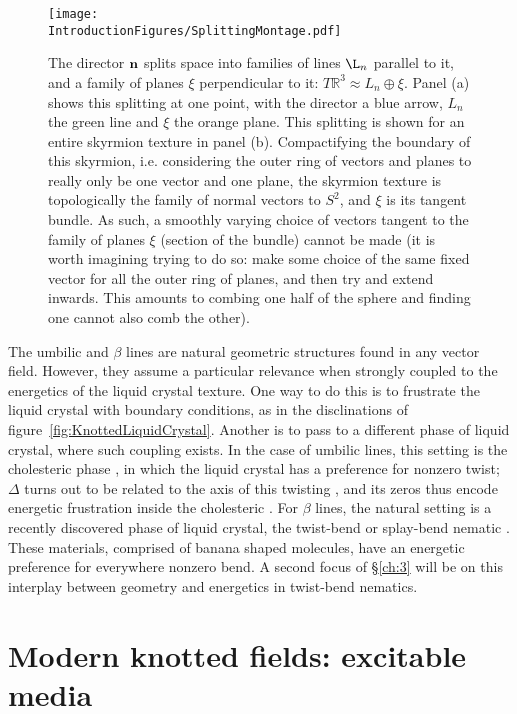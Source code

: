 \begin{figure}[htbp]
\centering
\texttt{[image: \\IntroductionFigures/SplittingMontage.pdf]}
\caption{ The director $\bf n $ splits space into families of lines $\L_n$ parallel to it, and a family of planes $\xi$ perpendicular to it: $T \mathbb{R}^3 \approx L_n \oplus \xi$. Panel (a) shows this splitting at one point, with the director a blue arrow, $L_n$ the green line and $\xi$ the orange plane. This splitting is shown for an entire skyrmion texture in panel (b). Compactifying the boundary of this skyrmion, i.e. considering the outer ring of vectors and planes to really only be one vector and one plane, the skyrmion texture is topologically the family of normal vectors to $S^2$, and $\xi$ is its tangent bundle. As such, a smoothly varying choice of vectors tangent to the family of planes $\xi$ (section of the bundle) cannot be made (it is worth imagining trying to do so: make some choice of the same fixed vector for all the outer ring of planes, and then try and extend inwards. This amounts to combing one half of the sphere and finding one cannot also comb the other).}
\label{fig:SplittingMontage}
\end{figure}

The umbilic and $\beta$ lines are natural geometric structures found in any vector field. However, they assume a particular relevance when strongly coupled to the energetics of the liquid crystal texture. One way to do this is to frustrate the liquid crystal with boundary conditions, as in the disclinations of figure~\ref{fig:KnottedLiquidCrystal}. Another is to pass to a different phase of liquid crystal, where such coupling exists. In the case of umbilic lines, this setting is the cholesteric phase \citep{Bellar2014}, in which the liquid crystal has a preference for nonzero twist; $\Delta$ turns out to be related to the axis of this twisting \citep{AlexanderBook}, and its zeros thus encode energetic frustration inside the cholesteric \citep{Machon2016b}. For $\beta$ lines, the natural setting is a recently discovered phase of liquid crystal, the twist-bend or splay-bend nematic \citep{Lavrentovich2018}. These materials, comprised of banana shaped molecules, have an energetic preference for everywhere nonzero bend. A second focus of \S\ref{ch:3} will be on this interplay between geometry and energetics in twist-bend nematics. 

\section{Modern knotted fields: excitable media}
\label{sec:FN}

